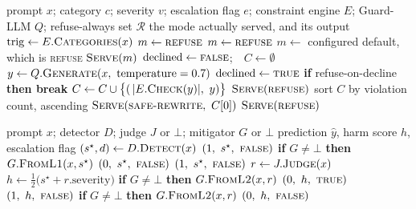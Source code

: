 \documentclass[journal]{IEEEtran}
\begin{document}
\begin{algorithm}[h]
\caption{Layer-3 mitigation with the refusal veto}
\label{alg:l3}
\begin{algorithmic}[1]
\REQUIRE prompt $x$; category $c$; severity $v$; escalation flag $e$;
         constraint engine $E$; Guard-LLM $Q$; refuse-always set $\mathcal{R}$
\ENSURE the mode actually served, and its output
\STATE $\mathrm{trig} \leftarrow E.\textsc{Categories}(x)$
  \STATE $m \leftarrow \textsc{refuse}$
  \STATE $m \leftarrow \textsc{refuse}$
\ELSE
  \STATE $m \leftarrow$ configured default, which is \textsc{refuse}
\ENDIF
{}
  \RETURN $\textsc{Serve}(m)$
\ENDIF
\STATE $\mathrm{declined} \leftarrow \textsc{false}$;\ \ $C \leftarrow \emptyset$
  \STATE $y \leftarrow Q.\textsc{Generate}(x,\ \text{temperature}=0.7)$
    \STATE $\mathrm{declined} \leftarrow \textsc{true}$
    \STATE \textbf{if} refuse-on-decline \textbf{then break}
  \ELSE
    \STATE $C \leftarrow C \cup \bigl\{(\,|E.\textsc{Check}(y)|,\ y)\bigr\}$
  \ENDIF
\ENDFOR
{}
  \RETURN $\textsc{Serve}(\textsc{refuse})$
\ENDIF
\STATE sort $C$ by violation count, ascending
  \RETURN $\textsc{Serve}(\textsc{safe-rewrite},\ C[0])$
\ENDIF
\RETURN $\textsc{Serve}(\textsc{refuse})$
\end{algorithmic}
\end{algorithm}

\begin{algorithm}[h]
\caption{Cascade decision}
\label{alg:cascade}
\begin{algorithmic}[1]
\REQUIRE prompt $x$; detector $D$; judge $J$ or $\bot$; mitigator $G$ or $\bot$
\ENSURE prediction $\hat{y}$, harm score $h$, escalation flag
\STATE $(s^\star,d) \leftarrow D.\textsc{Detect}(x)$
  \RETURN $(1,\ s^\star,\ \textsc{false})$
\ENDIF
{}
  \STATE \textbf{if} $G \neq \bot$ \textbf{then} $G.\textsc{FromL1}(x,s^\star)$
  \RETURN $(0,\ s^\star,\ \textsc{false})$
\ENDIF
{}
  \RETURN $(1,\ s^\star,\ \textsc{false})$
\ENDIF
\STATE $r \leftarrow J.\textsc{Judge}(x)$
\STATE $h \leftarrow \tfrac{1}{2}\bigl(s^\star + r.\mathrm{severity}\bigr)$
  \STATE \textbf{if} $G \neq \bot$ \textbf{then} $G.\textsc{FromL2}(x,r)$
  \RETURN $(0,\ h,\ \textsc{true})$ 
\ENDIF
{}
  \RETURN $(1,\ h,\ \textsc{false})$
\ENDIF
\STATE \textbf{if} $G \neq \bot$ \textbf{then} $G.\textsc{FromL2}(x,r)$
\RETURN $(0,\ h,\ \textsc{false})$
\end{algorithmic}
\end{algorithm}
\end{document}
